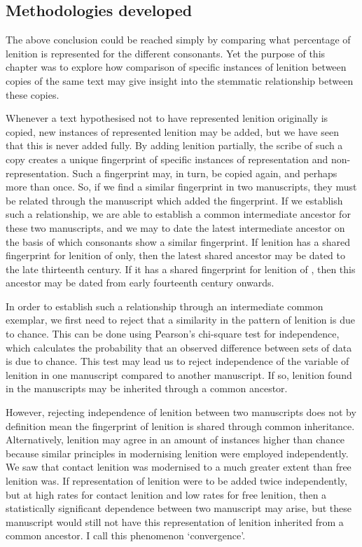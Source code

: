 \subsection{Methodologies developed}
\label{sec:meth-devel}


The above conclusion could be reached simply by comparing what percentage of lenition is represented for the different consonants. Yet the purpose of this chapter was to explore how comparison of specific instances of lenition between copies of the same text may give insight into the stemmatic relationship between these copies.

Whenever a text hypothesised not to have represented lenition originally is copied, new instances of represented lenition may be added, but we have seen that this is never added fully. By adding lenition partially, the scribe of such a copy creates a unique fingerprint of specific instances of representation and non-representation. Such a fingerprint may, in turn, be copied again, and perhaps more than once. So, if we find a similar fingerprint in two manuscripts, they must be related through the manuscript which added the fingerprint. If we establish such a relationship, we are able to establish a common intermediate ancestor for these two manuscripts, and we may to date the latest intermediate ancestor on the basis of which consonants show a similar fingerprint. If lenition has a shared fingerprint for lenition of  only, then the latest shared ancestor may be dated to the late thirteenth century. If it has a shared fingerprint for lenition of , then this ancestor may be dated from early fourteenth century onwards.

In order to establish such a relationship through an intermediate common exemplar, we first need to reject that a similarity in the pattern of lenition is due to chance. This can be done using Pearson's chi-square test for independence, which calculates the probability that an observed difference between sets of data is due to chance. This test may lead us to reject independence of the variable of lenition in one manuscript compared to another manuscript. If so, lenition found in the manuscripts may be inherited through a common ancestor.

However, rejecting independence of lenition between two manuscripts does not by definition mean the fingerprint of lenition is shared through common inheritance. Alternatively, lenition may agree in an amount of instances higher than chance because similar principles in modernising lenition were employed independently. We saw that contact lenition was modernised to a much greater extent than free lenition was. If representation of lenition were to be added twice independently, but at high rates for contact lenition and low rates for free lenition, then a statistically significant dependence between two manuscript may arise, but these manuscript would still not have this representation of lenition inherited from a common ancestor. I call this phenomenon `convergence'.

